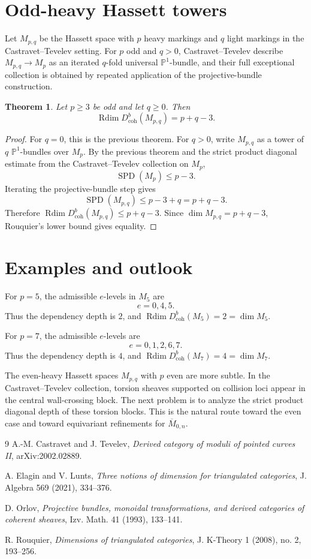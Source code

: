 \documentclass[11pt]{amsart}
\numberwithin{equation}{section}
\newtheorem{theorem}{Theorem}[section]
\theoremstyle{definition}
\DeclareMathOperator{\Rdim}{Rdim}
\DeclareMathOperator{\SPD}{SPD}
\newcommand{\Db}{D^b_{\mathrm{coh}}}
\begin{document}
\section{Odd-heavy Hassett towers}

Let $M_{p,q}$ be the Hassett space with $p$ heavy markings and $q$ light markings in the Castravet--Tevelev setting. For $p$ odd and $q>0$, Castravet--Tevelev describe $M_{p,q}\to M_p$ as an iterated $q$-fold universal $\mathbb P^1$-bundle, and their full exceptional collection is obtained by repeated application of the projective-bundle construction.

\begin{theorem}
Let $p\ge3$ be odd and let $q\ge0$. Then
\[
\Rdim \Db(M_{p,q})=p+q-3.
\]
\end{theorem}

\begin{proof}
For $q=0$, this is the previous theorem. For $q>0$, write $M_{p,q}$ as a tower of $q$ $\mathbb P^1$-bundles over $M_p$. By the previous theorem and the strict product diagonal estimate from the Castravet--Tevelev collection on $M_p$,
\[
\SPD(M_p)\le p-3.
\]
Iterating the projective-bundle step gives
\[
\SPD(M_{p,q})\le p-3+q=p+q-3.
\]
Therefore $\Rdim \Db(M_{p,q})\le p+q-3$. Since $\dim M_{p,q}=p+q-3$, Rouquier's lower bound gives equality.
\end{proof}

\section{Examples and outlook}

For $p=5$, the admissible $e$-levels in $M_5$ are
\[
e=0,4,5.
\]
Thus the dependency depth is $2$, and $\Rdim \Db(M_5)=2=\dim M_5$.

For $p=7$, the admissible $e$-levels are
\[
e=0,1,2,6,7.
\]
Thus the dependency depth is $4$, and $\Rdim \Db(M_7)=4=\dim M_7$.

The even-heavy Hassett spaces $M_{p,q}$ with $p$ even are more subtle. In the Castravet--Tevelev collection, torsion sheaves supported on collision loci appear in the central wall-crossing block. The next problem is to analyze the strict product diagonal depth of these torsion blocks. This is the natural route toward the even case and toward equivariant refinements for $\overline M_{0,n}$.

\begin{thebibliography}{9}
A.-M. Castravet and J. Tevelev, \emph{Derived category of moduli of pointed curves II}, arXiv:2002.02889.

A. Elagin and V. Lunts, \emph{Three notions of dimension for triangulated categories}, J. Algebra 569 (2021), 334--376.

D. Orlov, \emph{Projective bundles, monoidal transformations, and derived categories of coherent sheaves}, Izv. Math. 41 (1993), 133--141.

R. Rouquier, \emph{Dimensions of triangulated categories}, J. K-Theory 1 (2008), no. 2, 193--256.
\end{thebibliography}
\end{document}
